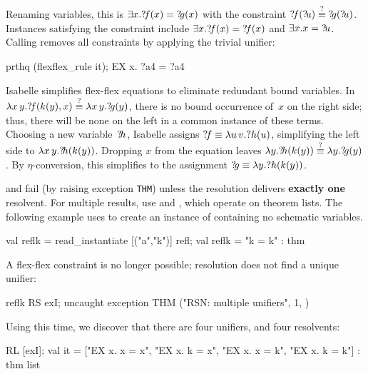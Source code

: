 \noindent
Renaming variables, this is $\exists x.{?\!f}(x)={?\!g}(x)$ with
the constraint ${{?\!f}({?\!u})\stackrel{?}{\equiv}{?\!g}({?\!u})}$.  Instances
satisfying the constraint include $\exists x.{?\!f}(x)={?\!f}(x)$ and
$\exists x.x={?\!u}$.  Calling  removes all
constraints by applying the trivial unifier:
\begin{ttbox} 
prthq (flexflex_rule it);
{\out EX x. ?a4 = ?a4}
\end{ttbox} 
Isabelle simplifies flex-flex equations to eliminate redundant bound
variables.  In $\lambda x\,y.{?\!f}(k(y),x) \stackrel{?}{\equiv} \lambda x\,y.{?\!g}(y)$,
there is no bound occurrence of~$x$ on the right side; thus, there will be
none on the left in a common instance of these terms.  Choosing a new
variable~${?\!h}$, Isabelle assigns ${?\!f}\equiv \lambda u\,v.?h(u)$,
simplifying the left side to $\lambda x\,y.{?\!h}(k(y))$.  Dropping $x$
from the equation leaves $\lambda y.{?\!h}(k(y)) \stackrel{?}{\equiv} \lambda
y.{?\!g}(y)$.  By $\eta$-conversion, this simplifies to the assignment
${?\!g}\equiv\lambda y.?h(k(y))$.

\begin{warn}
 and  fail (by raising exception \texttt{THM}) unless
the resolution delivers {\bf exactly one} resolvent.  For multiple results,
use  and , which operate on theorem lists.  The
following example uses  to create an instance
of  containing no schematic variables.
\begin{ttbox} 
val reflk = read_instantiate [("a","k")] refl;
{\out val reflk = "k = k" : thm}
\end{ttbox}

\noindent
A flex-flex constraint is no longer possible; resolution does not find a
unique unifier:
\begin{ttbox} 
reflk RS exI;
{\out uncaught exception}
{\out    THM ("RSN: multiple unifiers", 1,}
{\out         ["k = k", "?P(?x) ==> EX x. ?P(x)"])}
\end{ttbox}
Using  this time, we discover that there are four unifiers, and
four resolvents:
\begin{ttbox} 
[reflk] RL [exI];
{\out val it = ["EX x. x = x", "EX x. k = x",}
{\out           "EX x. x = k", "EX x. k = k"] : thm list}
\end{ttbox} 
\end{warn}



